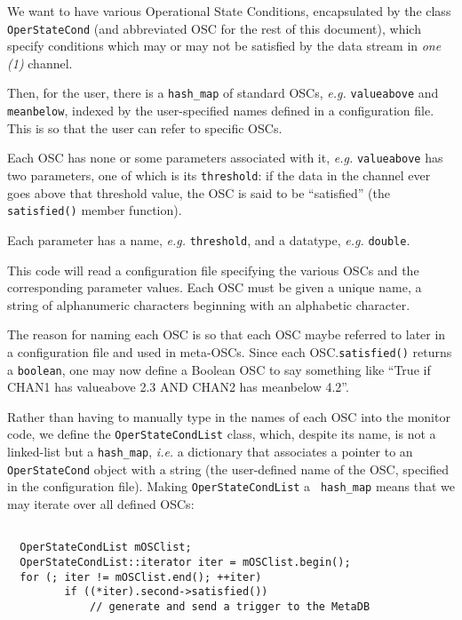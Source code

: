 {We want to have various Operational State Conditions, encapsulated by
the class \texttt{OperStateCond} (and abbreviated OSC for the rest of
this document), which specify conditions which may or may not be
satisfied by the data stream in \textit{one (1)} channel.

Then, for the user, there is a \texttt{hash\_map} of standard OSCs,
\textit{e.g.} \texttt{valueabove} and \texttt{meanbelow}, indexed by
the user-specified names defined in a configuration file. This is so
that the user can refer to specific OSCs.

Each OSC has none or some parameters associated with it, \textit{e.g.}
\texttt{valueabove} has two parameters, one of which is its
\texttt{threshold}: if the data in the channel ever goes above that
threshold value, the OSC is said to be ``satisfied'' (the
\texttt{satisfied()} member function).

Each parameter has a name, \textit{e.g.} \texttt{threshold}, and a
datatype, \textit{e.g.} \texttt{double}.

This code will read a configuration file specifying the various OSCs
and the corresponding parameter values.  Each OSC must be given a
unique name, a string of alphanumeric characters beginning with an
alphabetic character.

The reason for naming each OSC is so that each OSC maybe referred to
later in a configuration file and used in meta-OSCs.  Since each
OSC.\texttt{satisfied()} returns a \texttt{boolean}, one may now define a
Boolean OSC to say something like ``True if CHAN1 has valueabove 2.3
AND CHAN2 has meanbelow 4.2''.

Rather than having to manually type in the names of each OSC into the
monitor code, we define the \texttt{OperStateCondList} class, which,
despite its name, is not a linked-list but a \texttt{hash\_map}, \textit{
i.e.} a dictionary that associates a pointer to an \texttt{OperStateCond}
object with a string (the user-defined name of the OSC, specified in
the configuration file).  Making \texttt{OperStateCondList} a \texttt{
hash\_map} means that we may iterate over all defined OSCs:

\begin{verbatim}

  OperStateCondList mOSClist;
  OperStateCondList::iterator iter = mOSClist.begin();
  for (; iter != mOSClist.end(); ++iter)
         if ((*iter).second->satisfied())
             // generate and send a trigger to the MetaDB

\end{verbatim}

}
